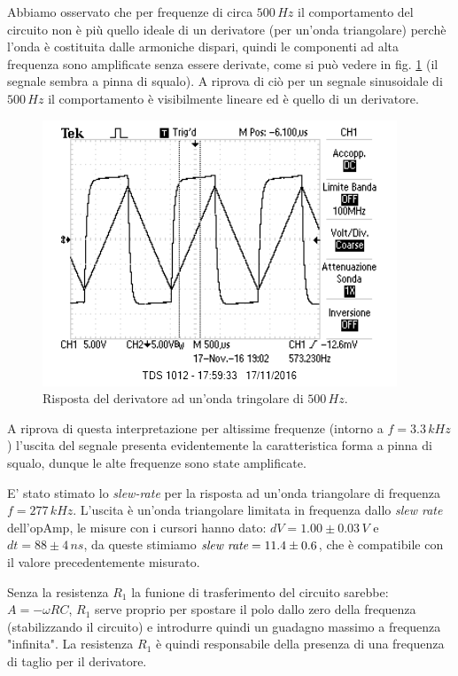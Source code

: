 \documentclass[10pt,a4paper]{article}
\begin{document}
Abbiamo osservato che per frequenze di circa $500 \, Hz$ il comportamento del circuito non è più quello ideale di un derivatore (per un'onda triangolare) perchè l'onda è costituita dalle armoniche dispari, quindi le componenti ad alta frequenza sono amplificate senza essere derivate, come si può vedere in fig. \ref{derivatore500} (il segnale sembra a pinna di squalo). A riprova di ciò per un segnale sinusoidale di $500 \,Hz$ il comportamento è visibilmente lineare ed è quello di un derivatore. 

\begin{figure}[!htb]
\centering
   \includegraphics[scale=1.0]{immagini/freq500derivatore.png}
\caption{Risposta del derivatore ad un'onda tringolare di $500\,Hz$.}
\label{derivatore500}
\end{figure}

A riprova di questa interpretazione per altissime frequenze (intorno a $f=3.3\,kHz$) l'uscita del segnale presenta evidentemente la caratteristica forma a pinna di squalo, dunque le alte frequenze sono state amplificate.

E' stato stimato lo \emph{slew-rate} per la risposta ad un'onda triangolare di frequenza $f=277 \, kHz$. L'uscita è un'onda triangolare limitata in frequenza dallo \emph{slew rate} dell'opAmp, le misure con i cursori hanno dato: $dV = 1.00 \pm 0.03 \, V$ e $dt = 88 \pm 4 \, ns$, da queste stimiamo $ \emph{slew rate} = 11.4 \pm 0.6$, che è compatibile con il valore precedentemente misurato.  

Senza la resistenza $R_1$ la funione di trasferimento del circuito sarebbe: $A = - \omega RC$, $R_1$ serve proprio per spostare il polo dallo zero della frequenza (stabilizzando il circuito) e introdurre quindi un guadagno massimo a frequenza "infinita". La resistenza $R_1$ è quindi responsabile della presenza di una frequenza di taglio per il derivatore.
\end{document}
